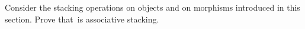 
\begin{exercise}
    \label{ex:relassocstack}
    Consider the stacking operations on objects and on morphisms introduced in this section.
    Prove that~\RelL is associative stacking.
\end{exercise}

